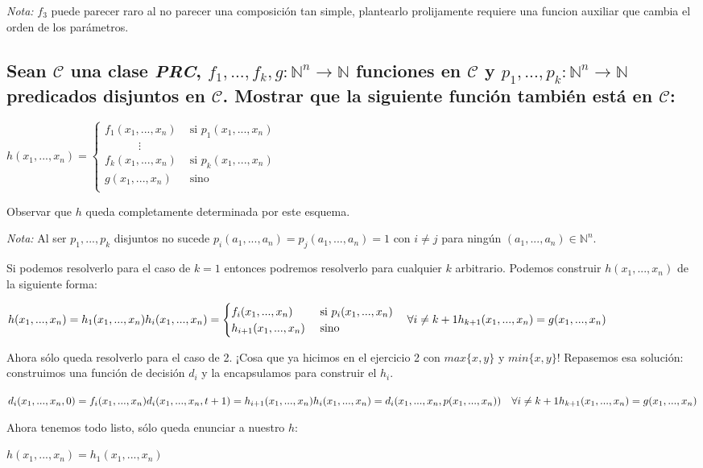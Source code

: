 \documentclass[11pt]{article} %
\newcommand{\desarrollo}[1]{

    \hspace{2em}
    \begin{minipage}{\textwidth}
        #1
    \end{minipage}

}
\newcommand{\nat}{\mathbb{N}}
\newcommand{\Ccur}{\mathcal{C}}
\begin{document}
\emph{Nota:} $f_3$ puede parecer raro al no parecer una composición tan simple, plantearlo prolijamente requiere una funcion auxiliar que cambia el orden de los parámetros.

\subsection{Sean $\Ccur$ una clase \emph{PRC}, $f_1,...,f_k,g:\nat^n\to\nat$ funciones en $\Ccur$ y $p_1,...,p_k:\nat^n\to\nat$ predicados disjuntos en $\Ccur$. Mostrar que la siguiente función también está en $\Ccur$:}

\desarrollo{$
h(x_1,...,x_n) =
\begin{cases}
  f_1(x_1,...,x_n) & \text{ si } p_1(x_1,...,x_n) \\
  \hspace{3em}\vdots \\
  f_k(x_1,...,x_n) & \text{ si } p_k(x_1,...,x_n) \\
  g(x_1,...,x_n) & \text{ sino} \\
\end{cases}
$}

Observar que $h$ queda completamente determinada por este esquema.

\emph{Nota:} Al ser $p_1,...,p_k$ disjuntos no sucede $p_i(a_1,...,a_n) = p_j(a_1,...,a_n) = 1$ con $i \neq j$ para ningún $(a_1,...,a_n) \in \nat^n$.

Si podemos resolverlo para el caso de $k=1$ entonces podremos resolverlo para cualquier $k$ arbitrario. Podemos construir $h(x_1,...,x_n)$ de la siguiente forma:
\desarrollo{$
h(x_1,...,x_n) = h_1(x_1,...,x_n) \\
h_i(x_1,...,x_n) =
\begin{cases}
  f_i(x_1,...,x_n) & \text{ si } p_i(x_1,...,x_n) \\
  h_{i+1}(x_1,...,x_n) & \text{ sino}
\end{cases}
\hspace{1em} \forall i \neq k+1 \\
h_{k+1}(x_1,...,x_n) = g(x_1,...,x_n)
$}

Ahora sólo queda resolverlo para el caso de 2. ¡Cosa que ya hicimos en el ejercicio 2 con $max\{x,y\}$ y $min\{x,y\}$! Repasemos esa solución: construimos una función de decisión $d_i$ y la encapsulamos para construir el $h_i$.
\desarrollo{$
d_i(x_1,...,x_n,0) = f_i(x_1,...,x_n) \\
d_i(x_1,...,x_n,t+1) = h_{i+1}(x_1,...,x_n) \\ \\
h_i(x_1,...,x_n) = d_i(x_1,...,x_n,p(x_1,...,x_n)) \hspace{1em} \forall i \neq k+1 \\
h_{k+1}(x_1,...,x_n) = g(x_1,...,x_n)
$}

Ahora tenemos todo listo, sólo queda enunciar a nuestro $h$:
\desarrollo{$h(x_1,...,x_n) = h_1(x_1,...,x_n)$}
\end{document}
